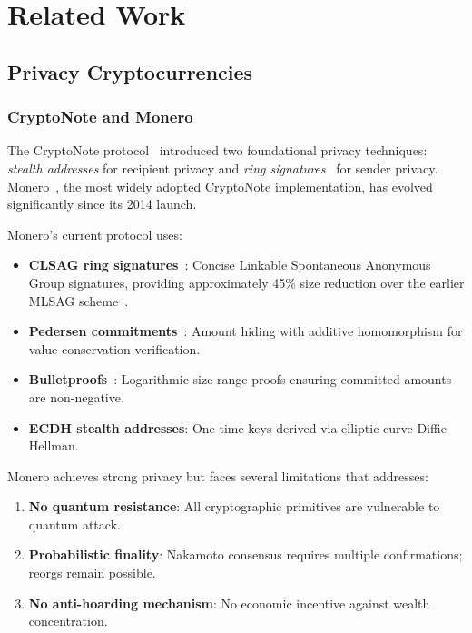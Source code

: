 
\section{Related Work}
\label{sec:related}

\subsection{Privacy Cryptocurrencies}

\subsubsection{CryptoNote and Monero}

The CryptoNote protocol~\cite{cryptonote} introduced two foundational
privacy techniques: \textit{stealth addresses} for recipient privacy and
\textit{ring signatures}~\cite{rivest2001} for sender privacy. Monero~\cite{monero}, the
most widely adopted CryptoNote implementation, has evolved significantly
since its 2014 launch.

Monero's current protocol uses:
\begin{itemize}
  \item \textbf{CLSAG ring signatures}~\cite{clsag}: Concise Linkable
    Spontaneous Anonymous Group signatures, providing approximately 45\%
    size reduction over the earlier MLSAG scheme~\cite{mlsag,mrl0005}.
  \item \textbf{Pedersen commitments}~\cite{pedersen}: Amount hiding with additive
    homomorphism for value conservation verification.
  \item \textbf{Bulletproofs}~\cite{bulletproofs}: Logarithmic-size range
    proofs ensuring committed amounts are non-negative.
  \item \textbf{ECDH stealth addresses}: One-time keys derived via
    elliptic curve Diffie-Hellman.
\end{itemize}

Monero achieves strong privacy but faces several limitations that \Botho
addresses:
\begin{enumerate}
  \item \textbf{No quantum resistance}: All cryptographic primitives are
    vulnerable to quantum attack.
  \item \textbf{Probabilistic finality}: Nakamoto consensus requires
    multiple confirmations; reorgs remain possible.
  \item \textbf{No anti-hoarding mechanism}: No economic incentive against
    wealth concentration.
\end{enumerate}

